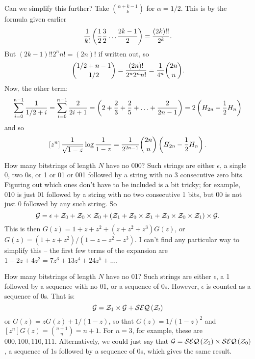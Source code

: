 Can we simplify this further?  Take $\alpha + k - 1 \choose k$ for $\alpha = 1/2$.
This is by the formula given earlier 
$$
 {1 \over k!} \left({1 \over 2} {3 \over 2} \ldots {2k - 1 \over 2}\right) =
  {\left(2k\right)!! \over 2^k}.
$$
But $\left(2k - 1\right)!! 2^n n! = \left(2 n\right)!$ if written out,
so
$$
 {1/2 + n - 1 \choose 1/2} = {\left(2 n\right)! \over 2^n 2^n n!} = {1 \over 4^n} {2n \choose n}.
$$
Now, the other term:
$$
 \sum_{i=0}^{n-1} {1 \over 1/2 + i} = \sum_{i=0}^{n-1} {2 \over 2 i + 1}
  = \left(2 + {2 \over 3} + {2 \over 5} + \ldots + {2 \over 2 n - 1}\right)
  = 2 \left(H_{2n} - {1 \over 2} H_n\right)
$$
and so
$$
 \left[z^n\right] {1 \over \sqrt{1 - z}} \log {1 \over 1 - z} =
  {1 \over 2^{2n-1}} {2n \choose n} \left(H_{2n} - {1 \over 2} H_n\right).
$$

\vskip 0.08in  How many bitstrings of
length $N$ have no 000?\hfil\break
Such strings are either $\epsilon$, a single 0, two 0s, or 1 or 01 or 001 followed
by a string with no 3 consecutive zero bits.  Figuring out which ones
don't have to be included is a bit tricky; for example, 010 is just 01 followed
by a string with no two consecutive 1 bits, but 00 is not just 0 followed
by any such string.  So
$$
 {\cal G} = \epsilon + {\cal Z}_0 + {\cal Z}_0 \times {\cal Z}_0
   + \left({\cal Z}_1 + {\cal Z}_0 \times {\cal Z}_1 
   + {\cal Z}_0 \times {\cal Z}_0 \times {\cal Z}_1\right) \times {\cal G}.
$$
This is then $G\left(z\right) = 1 + z + z^2 + \left(z + z^2 + z^3\right) G\left(z\right)$,
or $G\left(z\right) = \left(1 + z + z^2\right) / \left(1 - z - z^2 - z^3\right)$.  I can't
find any particular way to simplify this -- the first few terms of the expansion
are $1 + 2z + 4z^2 = 7z^3 + 13z^4 + 24z^5 + \ldots$.

\vskip 0.08in  How many bitstrings of
length $N$ have no 01?\hfil\break
Such strings are either $\epsilon$, a 1 followed by a sequence with no 01,
or a sequence of 0s.  However, $\epsilon$ is counted as a sequence of 0s. That is:
$$
 {\cal G} = {\cal Z}_1 \times {\cal G} + {\cal SEQ}\left({\cal Z_0}\right)
$$
or $G\left(z\right) = z G\left(z\right) + 1 /\left( 1 - z \right) $, so that
$G\left(z\right) = 1 / \left(1 - z\right)^2$ and $\left[z^n\right] G\left(z\right) =
{n + 1 \choose n} = n + 1$.  For $n=3$, for example, these are
$000, 100, 110, 111$.  Alternatively, we could just say that
${\cal G} = {\cal SEQ}\left({\cal Z}_1\right) \times {\cal SEQ}\left({\cal Z}_0\right)$,
a sequence of 1s followed by a sequence of 0s, which gives the same result.

